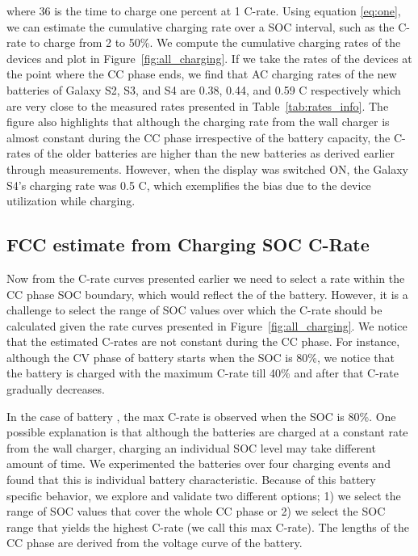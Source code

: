 \documentclass[journal]{IEEEtran}
\begin{document}
\noindent where 36 is the time to charge one percent at 1 C-rate. Using equation \eqref{eq:one}, we can estimate the cumulative charging rate over a SOC interval, such as the C-rate to charge from 2 to 50\%. We compute the cumulative charging rates of the devices and plot in Figure~\ref{fig:all_charging}. If we take the rates of the devices at the point where the CC phase ends, we find that AC charging rates of the new batteries of Galaxy S2, S3, and S4 are 0.38, 0.44, and 0.59 C respectively which are very close to the measured rates presented in Table~\ref{tab:rates_info}.  The figure also highlights that although the charging rate from the wall charger is almost constant during the CC phase irrespective of the battery capacity, the C-rates of the older batteries are higher than the new batteries as derived earlier through measurements. However, when the display was switched ON, the Galaxy S4's charging rate was 0.5 C, which exemplifies the bias due to the device utilization  while charging. 





















\subsection{FCC estimate from  Charging SOC C-Rate}
Now from the C-rate curves presented earlier we need to select a rate within the CC phase SOC boundary, which would reflect the  of the battery. However, it is a challenge to select the range of SOC values over which the C-rate should be calculated given the rate curves presented in Figure~\ref{fig:all_charging}. We notice that the estimated C-rates are not constant during the CC phase. For instance, although the CV phase of battery  starts when the SOC is 80\%, we notice that the battery is charged with the maximum C-rate till 40\% and after that C-rate gradually decreases. 

In the case of battery , the max C-rate is observed when the SOC is 80\%. One possible explanation is that although the batteries are charged at a constant rate from the wall charger, charging an individual SOC level may take different amount of time.  We experimented  the batteries over four charging events and found that this is individual battery characteristic. Because of this battery specific behavior, we explore and validate two different options; 1) we select the range of SOC values that cover the whole CC phase or 2) we select the SOC range that yields the highest C-rate (we call this max C-rate). The lengths of the CC phase are derived from the voltage curve of the battery. 
\end{document}
